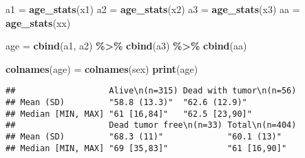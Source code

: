 \documentclass[
]{article}
\newenvironment{Shaded}{\begin{snugshade}}{\end{snugshade}}
\newcommand{\FunctionTok}[1]{\textcolor[rgb]{0.13,0.29,0.53}{\textbf{#1}}}
\newcommand{\NormalTok}[1]{#1}
\newcommand{\OtherTok}[1]{\textcolor[rgb]{0.56,0.35,0.01}{#1}}
\newcommand{\SpecialCharTok}[1]{\textcolor[rgb]{0.81,0.36,0.00}{\textbf{#1}}}
\begin{document}
\begin{Shaded}
\begin{Highlighting}[]
\NormalTok{a1 }\OtherTok{=} \FunctionTok{age\_stats}\NormalTok{(x1)}
\NormalTok{a2 }\OtherTok{=} \FunctionTok{age\_stats}\NormalTok{(x2)}
\NormalTok{a3 }\OtherTok{=} \FunctionTok{age\_stats}\NormalTok{(x3)}
\NormalTok{aa }\OtherTok{=} \FunctionTok{age\_stats}\NormalTok{(xx)}

\NormalTok{age }\OtherTok{=} \FunctionTok{cbind}\NormalTok{(a1, a2) }\SpecialCharTok{\%\textgreater{}\%} \FunctionTok{cbind}\NormalTok{(a3) }\SpecialCharTok{\%\textgreater{}\%} \FunctionTok{cbind}\NormalTok{(aa)}

\FunctionTok{colnames}\NormalTok{(age) }\OtherTok{=} \FunctionTok{colnames}\NormalTok{(sex)}
\FunctionTok{print}\NormalTok{(age)}
\end{Highlighting}
\end{Shaded}

\begin{verbatim}
##                   Alive\n(n=315) Dead with tumor\n(n=56)
## Mean (SD)         "58.8 (13.3)"  "62.6 (12.9)"          
## Median [MIN, MAX] "61 [16,84]"   "62.5 [23,90]"         
##                   Dead tumor free\n(n=33) Total\n(n=404)
## Mean (SD)         "68.3 (11)"             "60.1 (13)"   
## Median [MIN, MAX] "69 [35,83]"            "61 [16,90]"
\end{verbatim}
\end{document}
